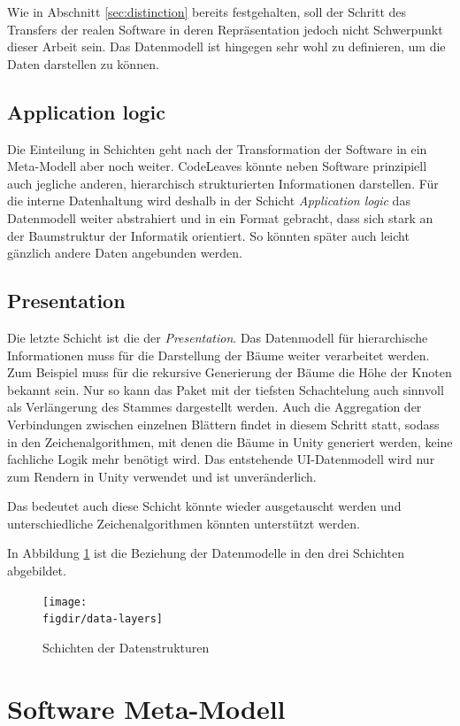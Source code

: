 Wie in Abschnitt \ref{sec:distinction} bereits festgehalten, soll der Schritt des Transfers der realen Software in deren Repräsentation jedoch nicht Schwerpunkt dieser Arbeit sein. Das Datenmodell ist hingegen sehr wohl zu definieren, um die Daten darstellen zu können.

\subsection*{Application logic}
Die Einteilung in Schichten geht nach der Transformation der Software in ein Meta-Modell aber noch weiter. CodeLeaves könnte neben Software prinzipiell auch jegliche anderen, hierarchisch strukturierten Informationen darstellen. Für die interne Datenhaltung wird deshalb in der Schicht \textit{Application logic} das Datenmodell weiter abstrahiert und in ein Format gebracht, dass sich stark an der Baumstruktur der Informatik orientiert. So könnten später auch leicht gänzlich andere Daten angebunden werden.

\subsection*{Presentation}
Die letzte Schicht ist die der \textit{Presentation}. Das Datenmodell für hierarchische Informationen muss für die Darstellung der Bäume weiter verarbeitet werden. Zum Beispiel muss für die rekursive Generierung der Bäume die Höhe der Knoten bekannt sein. Nur so kann das Paket mit der tiefsten Schachtelung auch sinnvoll als Verlängerung des Stammes dargestellt werden. Auch die Aggregation der Verbindungen zwischen einzelnen Blättern findet in diesem Schritt statt, sodass in den Zeichenalgorithmen, mit denen die Bäume in Unity generiert werden, keine fachliche Logik mehr benötigt wird. Das entstehende UI-Datenmodell wird nur zum Rendern in Unity verwendet und ist unveränderlich.

Das bedeutet auch diese Schicht könnte wieder ausgetauscht werden und unterschiedliche Zeichenalgorithmen könnten unterstützt werden.

In Abbildung \ref{fig:data-layers} ist die Beziehung der Datenmodelle in den drei Schichten abgebildet. 

\begin{figure}[htb]
  \texttt{[image: \\figdir/data-layers]}
  \caption{Schichten der Datenstrukturen}
  \label{fig:data-layers}
\end{figure}

\section{Software Meta-Modell}
\label{sec:software-model}

